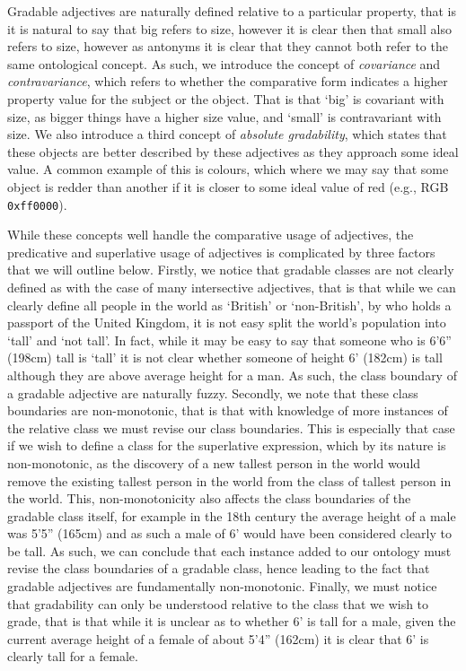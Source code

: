\documentclass[11pt]{article}
\begin{document}
Gradable adjectives are naturally defined relative to a particular property, that is it is natural to say that big refers to size, however it is clear then that small also refers to size, however as antonyms it is clear that they cannot both refer to the same ontological concept. As such, we introduce the concept of \emph{covariance} and \emph{contravariance}, which refers to whether the comparative form indicates a higher property value for the subject or the object. That is that `big' is covariant with size, as bigger things have a higher size value, and `small' is contravariant with size. We also introduce a third concept of \emph{absolute gradability}, which states that these objects are better described by these adjectives as they approach some ideal value. A common example of this is colours, which where we may say that some object is redder than another if it is closer to some ideal value of red (e.g., RGB {\tt 0xff0000}). 

While these concepts well handle the comparative usage of adjectives, the predicative and superlative usage of adjectives is complicated by three factors that we will outline below. Firstly, we notice that gradable classes are not clearly defined as with the case of many intersective adjectives, that is that while we can clearly define all people in the world as `British' or `non-British', by who holds a passport of the United Kingdom, it is not easy split the world's population into `tall' and `not tall'. In fact, while it may be easy to say that someone who is 6'6'' (198cm) tall is `tall' it is not clear whether someone of height 6' (182cm) is tall although they are above average height for a man. As such, the class boundary of a gradable adjective are naturally fuzzy. Secondly, we note that these class boundaries are non-monotonic, that is that with knowledge of more instances of the relative class we must revise our class boundaries. This is especially that case if we wish to define a class for the superlative expression, which by its nature is non-monotonic, as the discovery of a new tallest person in the world would remove the existing tallest person in the world from the class of tallest person in the world. This, non-monotonicity also affects the class boundaries of the gradable class itself, for example in the 18th century the average height of a male was 5'5'' (165cm) and as such a male of 6' would have been considered clearly to be tall. As such, we can conclude that each instance added to our ontology must revise the class boundaries of a gradable class, hence leading to the fact that gradable adjectives are fundamentally non-monotonic. Finally, we must notice that gradability can only be understood relative to the class that we wish to grade, that is that while it is unclear as to whether 6' is tall for a male, given the current average height of a female of about 5'4'' (162cm) it is clear that 6' is clearly tall for a female.
\end{document}
